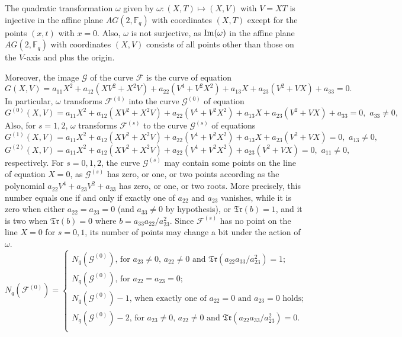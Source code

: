 \documentclass[sn-mathphys-num]{sn-jnl}%
\begin{document}
The quadratic transformation $\omega$ given by $\omega:(X,T)\mapsto (X,V)$ with $V=XT$ is injective in the affine plane $AG(2,\mathbb{F}_q)$ with coordinates $(X,T)$ except for the points $(x,t)$ with $x=0$.
Also, $\omega$ is not surjective, as
${\rm{Im}}(\omega)$ in the affine plane $AG(2,\mathbb{F}_q)$ with coordinates $(X,V)$ consists of all points other than those on the $V$-axis and plus the origin.


Moreover, the image $\mathcal{G}$ of the curve $\mathcal{F}$ is the curve of equation
\begin{equation*}
\label{eq21072025BO}
G(X,V)=a_{11}X^2+a_{12}(XV^2+X^2V)+a_{22}(V^4+V^2X^2)+a_{13}X+a_{23}(V^2+VX)+a_{33}=0.
\end{equation*}
In particular, $\omega$ transforms $\mathcal{F}^{(0)}$ into the  curve
$\mathcal{G}^{(0)}$ of equation
\begin{equation*}
\label{eq21072025B}
G^{(0)}(X,V)=a_{11}X^2+a_{12}(XV^2+X^2V)+a_{22}(V^4+V^2X^2)+a_{13}X+a_{23}(V^2+VX)+a_{33}=0,\,\, a_{33}\ne 0,
\end{equation*}
Also, for $s=1,2$, $\omega$ transforms $\mathcal{F}^{(s)}$ to the curve $\mathcal{G}^{(s)}$ of equations
\begin{equation*}
\label{eq21072025BA}
G^{(1)}(X,V)=a_{11}X^2+a_{12}(XV^2+X^2V)+a_{22}(V^4+V^2X^2)+a_{13}X+a_{23}(V^2+VX)=0,\,\, a_{13}\ne 0,
\end{equation*}
\begin{equation*}
\label{eq21072025BB}
G^{(2)}(X,V)=a_{11}X^2+a_{12}(XV^2+X^2V)+a_{22}(V^4+V^2X^2)+a_{23}(V^2+VX)=0,\,\, a_{11}\ne 0,
\end{equation*}
respectively.
For $s=0,1,2$, the curve $\mathcal{G}^{(s)}$ may contain some points on the line of equation $X=0$, as $\mathcal{G}^{(s)}$ has zero, or one, or two points according as the polynomial $a_{22}V^4+a_{23}V^2+a_{33}$ has zero, or one, or two roots. More precisely, this number equals one if and only if exactly one of $a_{22}$ and $a_{23}$  vanishes, while it is zero when  either $a_{22}=a_{23}=0$ (and $a_{33}\ne 0$ by hypothesis), or  
$\mathfrak{Tr}(b)=1$, and it is two  when $\mathfrak{Tr}(b)=0$ where  $b=a_{33}a_{22}/a_{23}^2.$
Since $\mathcal{F}^{(s)}$ has no point on the line $X=0$ for $s=0,1$, its number of points may change a bit  under the action of $\omega$.
\begin{equation}\label{eq19112025}
    N_q(\mathcal{F}^{(0)})=
\begin{cases}
 {\mbox{$N_q(\mathcal{G}^{(0)})$, for $a_{23}\ne 0$, $a_{22}\ne 0$ and $\mathfrak{Tr}(a_{22}a_{33}/a_{23}^2)=1$}};\\
  {\mbox{$N_q(\mathcal{G}^{(0)})$, for $a_{22}=a_{23}=0$}};\\
 {\mbox{$N_q(\mathcal{G}^{(0)})-1$, when exactly one of $a_{22}=0$ and $a_{23}=0$ holds;}}\\
 {\mbox{$N_q(\mathcal{G}^{(0)})-2$, for $a_{23}\ne 0$, $a_{22}\ne 0$ and $\mathfrak{Tr}(a_{22}a_{33}/a_{23}^2)=0$.}}\\
\end{cases}
\end{equation}
\end{document}

